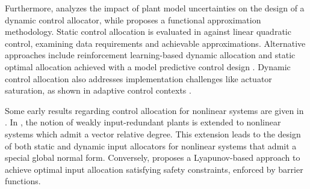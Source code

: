 Furthermore, \cite{tenaglia_robust_2023} analyzes the impact of plant model uncertainties on the design of a dynamic control allocator, while \cite{akbari_towards_2023} proposes a functional approximation methodology. Static control allocation is evaluated in \cite{duan_connections_2019} against linear quadratic control, examining data requirements and achievable approximations. Alternative approaches include reinforcement learning-based dynamic allocation \cite{kolaric_optimal_2020} and static optimal allocation achieved with a model predictive control design \cite{naderi_guaranteed_2019}. Dynamic control allocation also addresses implementation challenges like actuator saturation, as shown in adaptive control contexts \cite{tohidi_adaptive_2017}.

Some early results regarding control allocation for nonlinear systems are given in \cite{cristofaro_output_2017,castro_safe_2022}. In \cite{cristofaro_output_2017}, the notion of weakly input-redundant plants is extended to nonlinear systems which admit a vector relative degree. This extension leads to the design of both static and dynamic input allocators for nonlinear systems that admit a special global normal form. Conversely, \cite{castro_safe_2022} proposes a Lyapunov-based approach to achieve optimal input allocation satisfying safety constraints, enforced by barrier functions.
